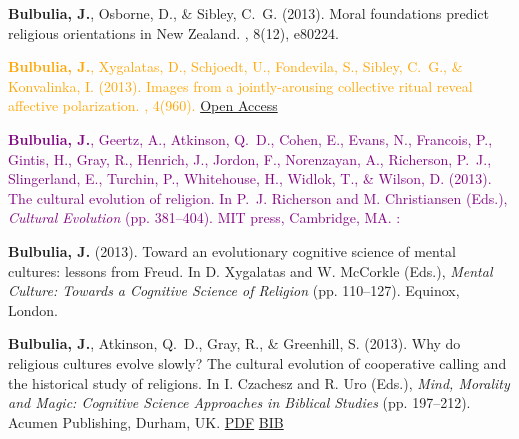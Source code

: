 \documentclass{article}
\begin{document}
\begin{thebibliography}{99}
{\bf Bulbulia, J.}, Osborne, D., \& Sibley, C.~G. (2013).
\newblock Moral foundations predict religious orientations in {N}ew {Z}ealand.
, 8(12), e80224.  


\textcolor{Orange}{{\bf Bulbulia, J.}, Xygalatas, D., Schjoedt, U., Fondevila, S., Sibley, C.~G., \& 
  Konvalinka, I. (2013).
\newblock Images from a jointly-arousing collective ritual reveal affective
  polarization.
, 4(960). }
\href{http://www.frontiersin.org/evolutionary_psychology_and_neuroscience/10.3389/fpsyg.2013.00960/abstract}{Open Access}   


\textcolor{Purple}{{\bf Bulbulia, J.}, Geertz, A., Atkinson, Q.~D., Cohen, E., Evans, N., Francois, P.,								
  Gintis, H., Gray, R., Henrich, J., Jordon, F., Norenzayan, A., Richerson,																
  P.~J., Slingerland, E., Turchin, P., Whitehouse, H., Widlok, T., \& Wilson,														
  D. (2013).
\newblock The cultural evolution of religion.
\newblock In P.~J. Richerson and M. Christiansen (Eds.), {\em Cultural
  Evolution} (pp. 381--404). MIT press, Cambridge, MA. : }\newblock %


{\bf Bulbulia, J.} (2013).
\newblock Toward an evolutionary cognitive science of mental cultures: lessons
  from {F}reud.
\newblock In D. Xygalatas and W. McCorkle (Eds.), {\em Mental Culture:
  Towards a Cognitive Science of Religion} (pp. 110--127). Equinox,
  London.  
  \newblock  %

 
{\bf Bulbulia, J.}, Atkinson, Q.~D., Gray, R., \& Greenhill, S. (2013).
\newblock Why do religious cultures evolve slowly? The cultural evolution of cooperative calling and the historical study of religions. In I. Czachesz and R. Uro (Eds.), {\em Mind, Morality and Magic: Cognitive Science Approaches in Biblical Studies} (pp. 197--212).
\newblock Acumen Publishing, Durham, UK.
\href{https://www.dropbox.com/s/jcf4k7e7mex62ax/2013.BulEtAl.why_rel_evo_slow.pdf?dl=0}{PDF} \href{https://www.dropbox.com/s/vva6osofhrjsd5r/2014.BulEtAl_WhyRelCultSlow.bib?dl=0}{BIB}



\end{thebibliography}
\end{document}
